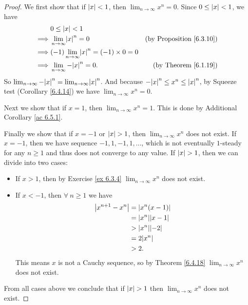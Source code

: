 \begin{proof}
    We first show that if \(\abs*{x} < 1\), then \(\lim_{n \to \infty} x^n = 0\).
    Since \(0 \leq \abs*{x} < 1\), we have
    \begin{align*}
                 & 0 \leq \abs*{x} < 1                                                                           \\
        \implies & \lim_{n \to \infty} \abs*{x}^n = 0                     & \text{(by Proposition \ref{6.3.10})} \\
        \implies & (-1)\lim_{n \to \infty} \abs*{x}^n = (-1) \times 0 = 0                                        \\
        \implies & \lim_{n \to \infty} -\abs*{x}^n = 0.                   & \text{(by Theorem \ref{6.1.19})}
    \end{align*}
    So \(\lim_{n \to \infty} -\abs*{x}^n = \lim_{n \to \infty} \abs*{x}^n\).
    And because \(-\abs*{x}^n \leq x^n \leq \abs*{x}^n\), by Squeeze test (Corollary \ref{6.4.14}) we have \(\lim_{n \to \infty} x^n = 0\).

    Next we show that if \(x = 1\), then \(\lim_{n \to \infty} x^n = 1\).
    This is done by Additional Corollary \ref{ac 6.5.1}.

    Finally we show that if \(x = -1\) or \(\abs*{x} > 1\), then \(\lim_{n \to \infty} x^n\) does not exist.
    If \(x = -1\), then we have sequence \(-1, 1, -1, 1, \dots\), which is not eventually \(1\)-steady for any \(n \geq 1\) and thus does not converge to any value.
    If \(\abs*{x} > 1\), then we can divide into two cases:
    \begin{itemize}
        \item If \(x > 1\), then by Exercise \ref{ex 6.3.4} \(\lim_{n \to \infty} x^n\) does not exist.
        \item If \(x < -1\), then \(\forall\ n \geq 1\) we have
              \begin{align*}
                  \abs*{x^{n + 1} - x^n} & = \abs*{x^n(x - 1)}      \\
                                         & = \abs*{x^n}\abs*{x - 1} \\
                                         & > \abs*{x^n}\abs*{-2}    \\
                                         & = 2\abs*{x^n}            \\
                                         & > 2.
              \end{align*}
              This means \(x\) is not a Cauchy sequence, so by Theorem \ref{6.4.18} \(\lim_{n \to \infty} x^n\) does not exist.
    \end{itemize}
    From all cases above we conclude that if \(\abs*{x} > 1\) then \(\lim_{n \to \infty} x^n\) does not exist.
\end{proof}

